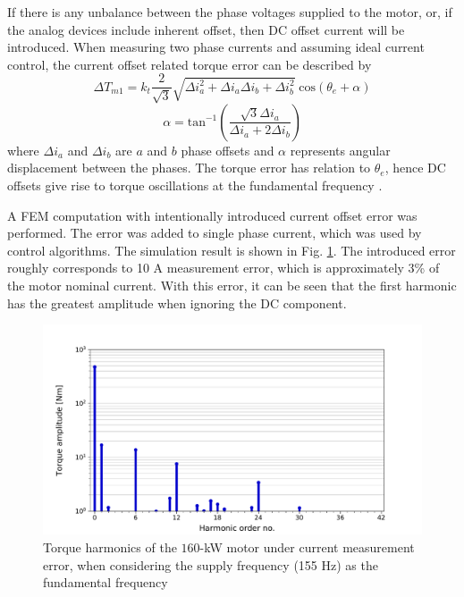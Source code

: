 If there is any unbalance between the phase voltages supplied to the motor, or, if the analog devices include inherent offset, then DC offset current will be introduced. When measuring two phase currents and assuming ideal current control, the current offset related torque error can be described by \cite{current_scaling:1998}
\begin{equation}
    \Delta T_{m1} = k_t \frac{2}{\sqrt{3}}\sqrt{\Delta i_a^2 + \Delta i_a \Delta i_b + \Delta i_b^2} \; \text{cos}(\theta_e + \alpha)
\end{equation}
$$\alpha = \text{tan}^{-1}\left(\frac{\sqrt{3}\Delta i_a}{\Delta i_a + 2 \Delta i_b}\right)$$
where $\Delta i_a$ and $\Delta i_b$ are $a$ and $b$ phase offsets and $\alpha$ represents angular displacement between the phases. The torque error has relation to $\theta_e$, hence DC offsets give rise to torque oscillations at the fundamental frequency \cite{current_scaling:1998, CTR_SW:1998, ILC:2004, ILC:2018}.

A FEM computation with intentionally introduced current offset error was performed. The error was added to single phase current, which was used by control algorithms. The simulation result is shown in Fig. \ref{FEM_current-meas-error}. The introduced error roughly corresponds to 10 A measurement error, which is approximately 3\% of the motor nominal current. With this error, it can be seen that the first harmonic has the greatest amplitude when ignoring the DC component.
\begin{figure}[htb] 
    \centering
    \includegraphics[width=1.0\linewidth]{images/current-measurement-error.pdf} 
    \caption{Torque harmonics of the $160$-kW motor under current measurement error, when considering the supply frequency (155 Hz) as the fundamental frequency}
    \label{FEM_current-meas-error}
\end{figure}

